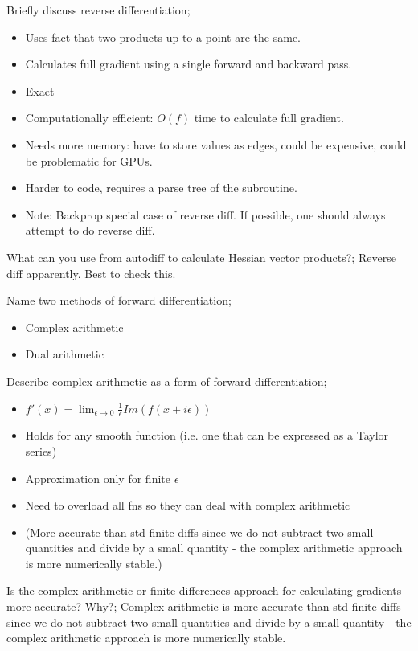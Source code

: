 \documentclass{article}
\begin{document}
Briefly discuss reverse differentiation; \begin{itemize} \item Uses fact that two products up to a point are the same. \item Calculates full gradient using a single forward and backward pass.  \item Exact \item Computationally efficient: $O(f)$ time to calculate full gradient.  \item Needs more memory: have to store values as edges, could be expensive, could be problematic for GPUs.  \item Harder to code, requires a parse tree of the subroutine.  \item Note: Backprop special case of reverse diff. If possible, one should always attempt to do reverse diff.  \end{itemize}

What can you use from autodiff to calculate Hessian vector products?; Reverse diff apparently. Best to check this.

Name two methods of forward differentiation; \begin{itemize} \item Complex arithmetic \item Dual arithmetic \end{itemize}

Describe complex arithmetic as a form of forward differentiation; \begin{itemize} \item $f'(x)=\lim_{\epsilon\rightarrow 0}\frac{1}{\epsilon}Im(f(x+i\epsilon))$ \item Holds for any smooth function (i.e. one that can be expressed as a Taylor series) \item Approximation only for finite $\epsilon$ \item Need to overload all fns so they can deal with complex arithmetic \item (More accurate than std finite diffs since we do not subtract two small quantities and divide by a small quantity - the complex arithmetic approach is more numerically stable.) \end{itemize}

Is the complex arithmetic or finite differences approach for calculating gradients more accurate? Why?; Complex arithmetic is more accurate than std finite diffs since we do not subtract two small quantities and divide by a small quantity - the complex arithmetic approach is more numerically stable.
\end{document}
